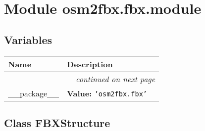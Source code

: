 %
%
%


\section{Module osm2fbx.fbx.module}

    \label{osm2fbx:fbx:module}


  \subsection{Variables}

    \vspace{-1cm}
\hspace{\varindent}\begin{longtable}{|p{\varnamewidth}|p{\vardescrwidth}|l}
\cline{1-2}
\cline{1-2} \centering \textbf{Name} & \centering \textbf{Description}& \\
\cline{1-2}
\endhead\cline{1-2}\multicolumn{3}{r}{\small\textit{continued on next page}}\\\endfoot\cline{1-2}
\endlastfoot\raggedright \_\-\_\-p\-a\-c\-k\-a\-g\-e\-\_\-\_\- & \raggedright \textbf{Value:} 
{\tt \texttt{'}\texttt{osm2fbx.fbx}\texttt{'}}&\\
\cline{1-2}
\end{longtable}



\subsection{Class FBXStructure}

